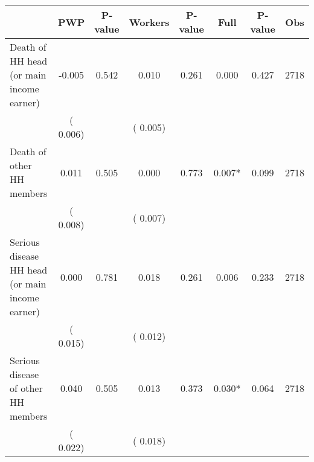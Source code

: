 
\begin{tabular}{l*{7}{c}}\hline&\multicolumn{1}{c}{PWP}&\multicolumn{1}{c}{P-value}&\multicolumn{1}{c}{Workers}&\multicolumn{1}{c}{P-value}&\multicolumn{1}{c}{Full}&\multicolumn{1}{c}{P-value}&\multicolumn{1}{c}{Obs} \\ \hline

 Death of HH head (or main income earner)       &             -0.005       &        0.542  &              0.010       &        0.261  &              0.000       &              0.427 &  2718 \\ 
                       &       (       0.006)             &                               &       (       0.005)                     &                               &                                               &                                &                      \\ 

 Death of other HH members       &              0.011       &        0.505  &              0.000       &        0.773  &              0.007*       &              0.099 &  2718 \\ 
                       &       (       0.008)             &                               &       (       0.007)                     &                               &                                               &                                &                      \\ 

 Serious disease HH head (or main income earner)       &              0.000       &        0.781  &              0.018       &        0.261  &              0.006       &              0.233 &  2718 \\ 
                       &       (       0.015)             &                               &       (       0.012)                     &                               &                                               &                                &                      \\ 

 Serious disease of other HH members       &              0.040       &        0.505  &              0.013       &        0.373  &              0.030*       &              0.064 &  2718 \\ 
                       &       (       0.022)             &                               &       (       0.018)                     &                               &                                               &                                &                      \\ 


\end{tabular}

